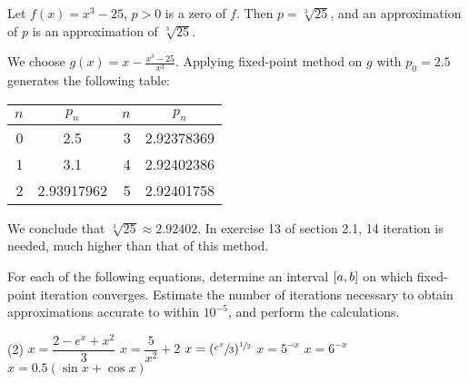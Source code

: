 \documentclass[../../../../Assignments]{subfiles}
\begin{document}
\begin{solution}
    Let \(f(x) = x^3 - 25\), \(p > 0\) is a zero of \(f\). Then \(p =
    \sqrt[3]{25}\), and an approximation of \(p\) is an approximation of
    \(\sqrt[3]{25}\).

    We choose \(g(x) = x - \frac{x^3 - 25}{x^3}\). Applying fixed-point method
    on \(g\) with \(p_0 = \num{2.5}\) generates the following table:

    \begin{table}[H]
        \centering
        \begin{tabular}{r S[table-format=1.8] r S[table-format=1.8]}
            \toprule
            \(n\)  &   {\(p_n\)}   &  \(n\)  &   {\(p_n\)}   \\
              &  2.5          &      3  &  2.92378369   \\
                1  &  3.1          &      4  &  2.92402386   \\
                2  &  2.93917962   &      5  &  2.92401758   \\
            \bottomrule
        \end{tabular}
    \end{table}

    We conclude that \(\sqrt[3]{25} \approx \num{2.92402}\). In exercise 13 of
    section 2.1, 14 iteration is needed, much higher than that of this method.
\end{solution}

\begin{exercise}
    For each of the following equations, determine an interval
    \(\interval{a}{b}\) on which fixed-point iteration converges. Estimate the
    number of iterations necessary to obtain approximations accurate to within
    \(10^{-5}\), and perform the calculations.

    \begin{tasks}(2)
        \task \(x = \dfrac{2 - e^x + x^2}{3}\)
        \task \(x = \dfrac{5}{x^2} + 2\)
        \task \(x = (\sfrac{e^x}{3})^{\sfrac{1}{2}}\)
        \task \(x = 5^{-x}\)
        \task \(x = 6^{-x}\)
        \task \(x = \num{0.5}(\sin{x} + \cos{x})\)
    \end{tasks}
\end{exercise}
\end{document}
